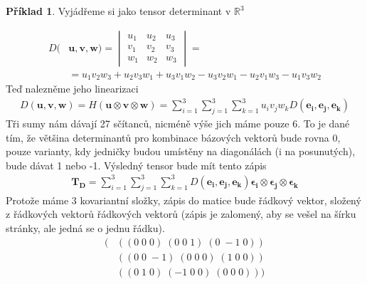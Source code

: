\documentclass[a5paper,12pt]{amsbook}
\theoremstyle{definition}
\newtheorem{example}{Příklad}[chapter]
\newcommand{\myvec}[1]{\bm{#1}}
\newcommand{\myspace}[1]{\mathbb{#1}}
\begin{document}
\begin{example}
Vyjádřeme si jako tensor determinant v $\myspace{R}^3$

\begin{equation*}
\begin{split}
D(&\myvec{u}, \myvec{v}, \myvec{w}) =
\begin{vmatrix}
u_1 & u_2 & u_3 \\
v_1 & v_2 & v_3 \\
w_1 & w_2 & w_3
\end{vmatrix} = \\
&= u_1v_2w_3 + u_2v_3w_1 + u_3v_1w_2 - u_3v_2w_1 - u_2v_1w_3 - u_1v_3w_2
\end{split}
\end{equation*}
Teď nalezněme jeho linearizaci
\begin{equation*}
\begin{split}
D(\myvec{u}, \myvec{v}, \myvec{w}) = H(\myvec{u}\otimes\myvec{v}\otimes\myvec{w})
  = \sum_{i=1}^{3}\sum_{j=1}^{3}\sum_{k=1}^{3}u_i v_j w_k D(\myvec{e_i}, \myvec{e_j}, \myvec{e_k})
\end{split}
\end{equation*}
Tři sumy nám dávají 27 sčítanců, nicméně výše jich máme pouze 6. To je dané tím, že většina
determinantů pro kombinace bázových vektorů bude rovna 0, pouze varianty, kdy jedničky budou umístěny
na diagonálách (i na posunutých), bude dávat 1 nebo -1. Výsledný tensor bude mít tento zápis
\begin{equation*}
\begin{split}
\myvec{T_D} =
  \sum_{i=1}^{3}\sum_{j=1}^{3}\sum_{k=1}^{3} D(\myvec{e_i}, \myvec{e_j}, \myvec{e_k})
    \myvec{\epsilon_i}\otimes\myvec{\epsilon_j}\otimes\myvec{\epsilon_k}
\end{split}
\end{equation*}
Protože máme 3 kovariantní složky, zápis do matice bude řádkový vektor, složený z řádkových vektorů
řádkových vektorů (zápis je zalomený, aby se vešel na šírku stránky, ale jedná se o jednu řádku).
\begin{equation*}
\begin{split}
(&((0\;0\;0)\;(0\;0\;1)\;(0\;-1\;0))\\
 &((0\;0\;-1)\;(0\;0\;0)\;(1\;0\;0))\\
 &((0\;1\;0)\;(-1\;0\;0)\;(0\;0\;0)))
\end{split}
\end{equation*}
\end{example}
\end{document}
